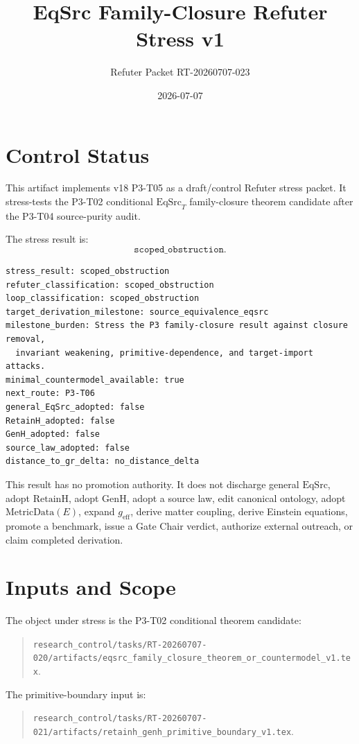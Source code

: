 \documentclass[11pt]{article}
\title{EqSrc Family-Closure Refuter Stress v1}
\author{Refuter Packet RT-20260707-023}
\date{2026-07-07}
\newcommand{\EqSrc}{\mathrm{EqSrc}}
\newcommand{\EqSrcT}{\mathrm{EqSrc}_{T}}
\newcommand{\RetainH}{\mathrm{RetainH}}
\newcommand{\GenH}{\mathrm{GenH}}
\begin{document}
\maketitle

\section{Control Status}

This artifact implements v18 P3-T05 as a draft/control Refuter stress packet.
It stress-tests the P3-T02 conditional \(\EqSrcT\) family-closure theorem
candidate after the P3-T04 source-purity audit.

The stress result is:
\[
  \texttt{scoped\_obstruction}.
\]

\begin{verbatim}
stress_result: scoped_obstruction
refuter_classification: scoped_obstruction
loop_classification: scoped_obstruction
target_derivation_milestone: source_equivalence_eqsrc
milestone_burden: Stress the P3 family-closure result against closure removal,
  invariant weakening, primitive-dependence, and target-import attacks.
minimal_countermodel_available: true
next_route: P3-T06
general_EqSrc_adopted: false
RetainH_adopted: false
GenH_adopted: false
source_law_adopted: false
distance_to_gr_delta: no_distance_delta
\end{verbatim}

This result has no promotion authority. It does not discharge general
\(\EqSrc\), adopt \(\RetainH\), adopt \(\GenH\), adopt a source law, edit
canonical ontology, adopt \(\mathrm{MetricData}(E)\), expand
\(g_{\mathrm{eff}}\), derive matter coupling, derive Einstein equations,
promote a benchmark, issue a Gate Chair verdict, authorize external outreach,
or claim completed derivation.

\section{Inputs and Scope}

The object under stress is the P3-T02 conditional theorem candidate:
\begin{quote}
\texttt{research\_control/tasks/RT-20260707-020/artifacts/eqsrc\_family\_closure\_theorem\_or\_countermodel\_v1.tex}.
\end{quote}

The primitive-boundary input is:
\begin{quote}
\texttt{research\_control/tasks/RT-20260707-021/artifacts/retainh\_genh\_primitive\_boundary\_v1.tex}.
\end{quote}
\end{document}
